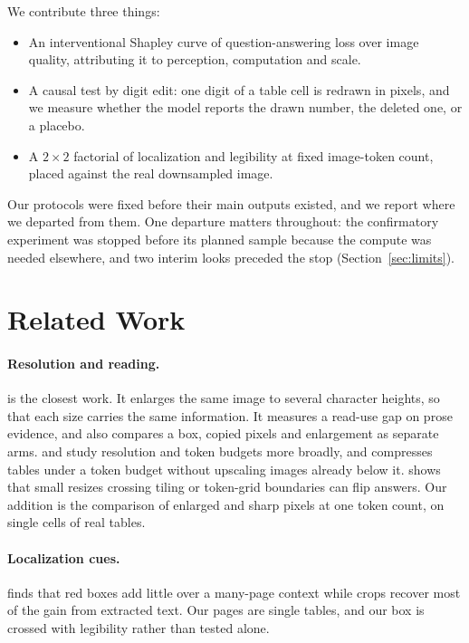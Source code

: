 \documentclass[11pt]{article}
\begin{document}
We contribute three things:
\begin{itemize}
\item An interventional Shapley curve of question-answering loss over image quality, attributing it to perception, computation and scale.
\item A causal test by digit edit: one digit of a table cell is redrawn in pixels, and we measure whether the model reports the drawn number, the deleted one, or a placebo.
\item A $2\times2$ factorial of localization and legibility at fixed image-token count, placed against the real downsampled image.
\end{itemize}

Our protocols were fixed before their main outputs existed, and we report where we departed from them. One departure matters throughout: the confirmatory experiment was stopped before its planned sample because the compute was needed elsewhere, and two interim looks preceded the stop (Section~\ref{sec:limits}).

\section{Related Work}

\paragraph{Resolution and reading.} \citet{shi2026readaloud} is the closest work. It enlarges the same image to several character heights, so that each size carries the same information. It measures a read-use gap on prose evidence, and also compares a box, copied pixels and enlargement as separate arms. \citet{li2025resbench} and \citet{hu2026lookzoom} study resolution and token budgets more broadly, and \citet{alonso2026table64} compresses tables under a token budget without upscaling images already below it. \citet{lin2026readingright} shows that small resizes crossing tiling or token-grid boundaries can flip answers. Our addition is the comparison of enlarged and sharp pixels at one token count, on single cells of real tables.

\paragraph{Localization cues.} \citet{xia2026foundnotread} finds that red boxes add little over a many-page context while crops recover most of the gain from extracted text. Our pages are single tables, and our box is crossed with legibility rather than tested alone.
\end{document}
